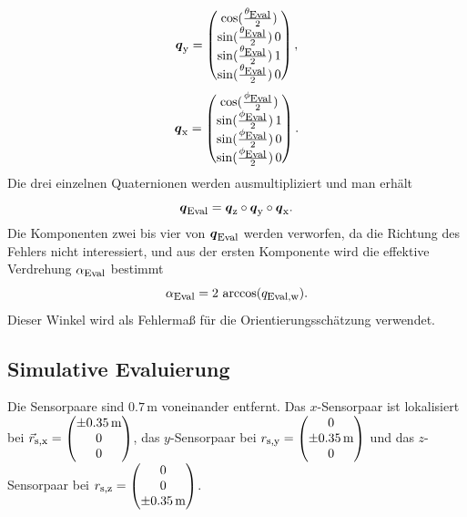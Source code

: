 \begin{equation}
  \mbox{\boldmath ${q}$}_{\textrm{\footnotesize{y}}} = \begin{pmatrix}
    \cos(\frac{\theta_{\textrm{\footnotesize{Eval}}}}{2}) \\
    \sin(\frac{\theta_{\textrm{\footnotesize{Eval}}}}{2})\,0 \\
    \sin(\frac{\theta_{\textrm{\footnotesize{Eval}}}}{2})\,1 \\
    \sin(\frac{\theta_{\textrm{\footnotesize{Eval}}}}{2})\,0 
\end{pmatrix},
\label{eq:quatY}
\end{equation}
\begin{equation}
  \mbox{\boldmath ${q}$}_{\textrm{\footnotesize{x}}} = \begin{pmatrix}
    \cos(\frac{\phi_{\textrm{\footnotesize{Eval}}}}{2}) \\
    \sin(\frac{\phi_{\textrm{\footnotesize{Eval}}}}{2})\,1 \\
    \sin(\frac{\phi_{\textrm{\footnotesize{Eval}}}}{2})\,0 \\
    \sin(\frac{\phi_{\textrm{\footnotesize{Eval}}}}{2})\,0 
\end{pmatrix}.
\label{eq:quatX}
\end{equation}
Die drei einzelnen Quaternionen werden ausmultipliziert und man erhält
\begin{equation}
  \mbox{\boldmath ${q}$}_{\textrm{\footnotesize{Eval}}} = \mbox{\boldmath ${q}$}_{\textrm{\footnotesize{z}}} \circ \mbox{\boldmath ${q}$}_{\textrm{\footnotesize{y}}} \circ \mbox{\boldmath ${q}$}_{\textrm{\footnotesize{x}}}.
  \label{eq:QuatEval}
\end{equation}
Die Komponenten zwei bis vier von $\mbox{\boldmath ${q}$}_{\textrm{\footnotesize{Eval}}}$ werden verworfen, da die Richtung des Fehlers nicht interessiert, und aus der ersten Komponente wird die effektive Verdrehung $\alpha_{\textrm{\footnotesize{Eval}}}$ bestimmt
\begin{equation}
  \alpha_{\textrm{\footnotesize{Eval}}} = 2\,\arccos(q_{\textrm{\footnotesize{Eval,w}}}).
  \label{eq:EffVerd}
\end{equation}
Dieser Winkel wird als Fehlermaß für die Orientierungsschätzung verwendet. 
 

\subsection{Simulative Evaluierung}
Die Sensorpaare sind $0.7\,\text{m}$ voneinander entfernt. Das $x$-Sensorpaar ist lokalisiert bei $\vec{r}_{\textrm{\footnotesize{s,x}}} = \begin{pmatrix}
  \pm 0.35\,\text{m} \\
  0 \\
  0 
\end{pmatrix}$, das $y$-Sensorpaar bei ${r}_{\textrm{\footnotesize{s,y}}} = \begin{pmatrix}
  0 \\
  \pm 0.35\,\text{m} \\
  0 
\end{pmatrix}$ und das $z$-Sensorpaar bei  ${r}_{\textrm{\footnotesize{s,z}}} = \begin{pmatrix}
  0 \\
  0 \\
  \pm 0.35\,\text{m} 
\end{pmatrix}$.
